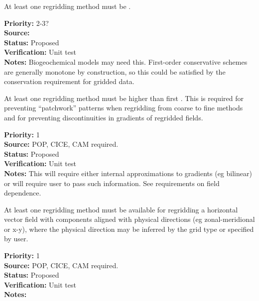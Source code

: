 
At least one regridding method must be .

\begin{reqlist}
{\bf Priority:} 2-3? \\
{\bf Source:}  \\
{\bf Status:} Proposed \\
{\bf Verification:} Unit test \\
{\bf Notes:} Biogeochemical models may need this.  First-order
             conservative schemes are generally monotone by
             construction, so this could be satisfied by the
             conservation requirement for gridded data.
\end{reqlist}



At least one regridding method must be higher than first
.  This is required for preventing
``patchwork'' patterns when regridding from coarse to fine
methods and for preventing discontinuities in gradients of
regridded fields.

\begin{reqlist}
{\bf Priority:} 1 \\
{\bf Source:}  POP, CICE, CAM required. \\
{\bf Status:} Proposed \\
{\bf Verification:} Unit test \\
{\bf Notes:} This will require either internal approximations to
             gradients (eg bilinear) or will require user
             to pass such information.  See requirements on field
             dependence.
\end{reqlist}


At least one regridding method must be available for regridding a horizontal
vector field with components aligned with physical directions 
(eg zonal-meridional or x-y), where the physical direction may be
inferred by the grid type or specified by user.

\begin{reqlist}
{\bf Priority:} 1 \\
{\bf Source:}  POP, CICE, CAM required. \\
{\bf Status:} Proposed \\
{\bf Verification:} Unit test \\
{\bf Notes:} 
\end{reqlist}

